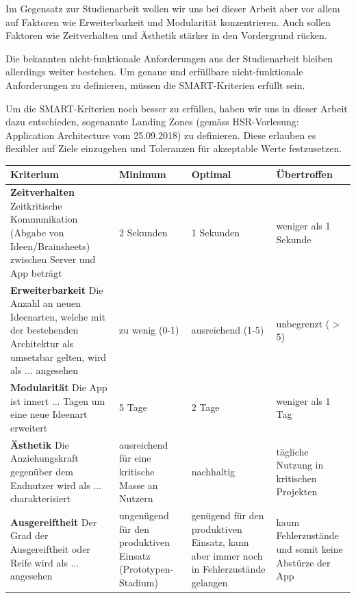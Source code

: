 Im Gegensatz zur Studienarbeit wollen wir uns bei dieser Arbeit aber vor allem auf Faktoren wie Erweiterbarkeit und Modularität konzentrieren. Auch sollen Faktoren wie Zeitverhalten und Ästhetik stärker in den Vordergrund rücken. 

Die bekannten nicht-funktionale Anforderungen aus der Studienarbeit bleiben allerdings weiter bestehen. Um genaue und erfüllbare nicht-funktionale Anforderungen zu definieren, müssen die SMART-Kriterien \cite{SMART} erfüllt sein.

Um die SMART-Kriterien noch besser zu erfüllen, haben wir uns in dieser Arbeit dazu entschieden, sogenannte Landing Zones (gemäss HSR-Vorlesung: Application Architecture vom 25.09.2018) zu definieren. Diese erlauben es flexibler auf Ziele einzugehen und Toleranzen für akzeptable Werte festzusetzen.

\begin{center}
    \begin{tabular}{ | p{6cm} | p{2.5cm} | p{2.5cm} | p{2.5cm} |}
    	\hline
    Kriterium & Minimum & Optimal & Übertroffen \\ 
    	\hline
    \textbf{Zeitverhalten} \newline Zeitkritische Kommunikation (Abgabe von Ideen/Brainsheets) zwischen Server und App beträgt & 2 Sekunden & 1 Sekunden & weniger als 1 Sekunde \\
    	\hline
    \textbf{Erweiterbarkeit} \newline Die Anzahl an neuen Ideenarten, welche mit der bestehenden Architektur als umsetzbar gelten, wird als ... angesehen & zu wenig (0-1) & ausreichend (1-5) & unbegrenzt ($>$5)\\
    	\hline
    \textbf{Modularität} \newline Die App ist innert ... Tagen um eine neue Ideenart erweitert & 5 Tage & 2 Tage & weniger als 1 Tag \\
    	\hline
    \textbf{Ästhetik} \newline Die Anziehungskraft gegenüber dem Endnutzer wird als ... charakterisiert & ausreichend für eine kritische Masse an Nutzern & nachhaltig & tägliche Nutzung in kritischen Projekten \\
    	\hline
    \textbf{Ausgereiftheit} \newline Der Grad der Ausgereiftheit oder Reife wird als ... angesehen & ungenügend für den produktiven Einsatz (Prototypen-Stadium) & genügend für den produktiven Einsatz, kann aber immer noch in Fehlerzustände gelangen & kaum Fehlerzustände und somit keine Abstürze der App  \\
    	\hline
    \end{tabular}
\end{center}
